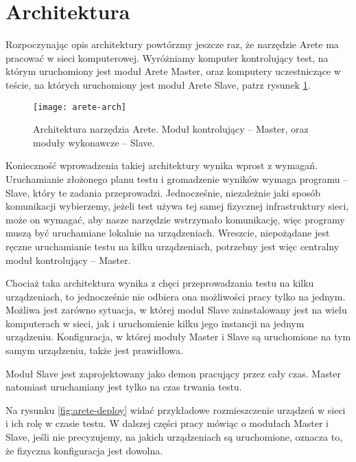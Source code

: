 \documentclass[00-praca-magisterska.tex]{subfiles}
\begin{document}
\section{Architektura}
\label{arete-architektura}

Rozpoczynając opis architektury powtórzmy jeszcze raz, że narzędzie Arete ma
pracować w sieci komputerowej. Wyróżniamy komputer kontrolujący test, na którym
uruchomiony jest moduł Arete Master, oraz komputery uczestniczące w teście, na
których uruchomiony jest moduł Arete Slave, patrz rysunek \ref{fig:arete-arch}.

\begin{figure}
\begin{center}
\leavevmode
\texttt{[image: arete-arch]}
\end{center}
\caption{Architektura narzędzia Arete. Moduł kontrolujący -- Master, oraz
moduły wykonawcze -- Slave.}
\label{fig:arete-arch}
\end{figure}

Konieczność wprowadzenia takiej architektury wynika wprost z wymagań.
Uruchamianie złożonego planu testu i gromadzenie wyników wymaga programu --
Slave, który te zadania przeprowadzi. Jednocześnie, niezależnie jaki sposób
komunikacji wybierzemy, jeżeli test używa tej samej fizycznej infrastruktury
sieci, może on wymagać, aby nasze narzędzie wstrzymało komunikację, więc
programy muszą być uruchamiane lokalnie na urządzeniach. Wreszcie,
niepożądane jest ręczne uruchamianie testu na kilku urządzeniach, potrzebny
jest więc centralny moduł kontrolujący -- Master.

Chociaż taka architektura wynika z chęci przeprowadzania testu na kilku
urządzeniach, to jednocześnie nie odbiera ona możliwości pracy tylko na jednym.
Możliwa jest zarówno sytuacja, w której moduł Slave zainstalowany jest na
wielu komputerach w sieci, jak i uruchomienie kilku jego instancji na
jednym urządzeniu. Konfiguracja, w której moduły Master i Slave są uruchomione
na tym samym urządzeniu, także jest prawidłowa.

Moduł Slave jest zaprojektowany jako demon pracujący przez cały czas. Master
natomiast uruchamiany jest tylko na czas trwania testu.

Na rysunku \ref{fig:arete-deploy} widać przykładowe rozmieszczenie urządzeń w
sieci i ich rolę w czasie testu. W dalszej części pracy mówiąc o modułach
Master i Slave, jeśli nie precyzujemy, na jakich urządzeniach są uruchomione,
oznacza to, że fizyczna konfiguracja jest dowolna.
\end{document}
